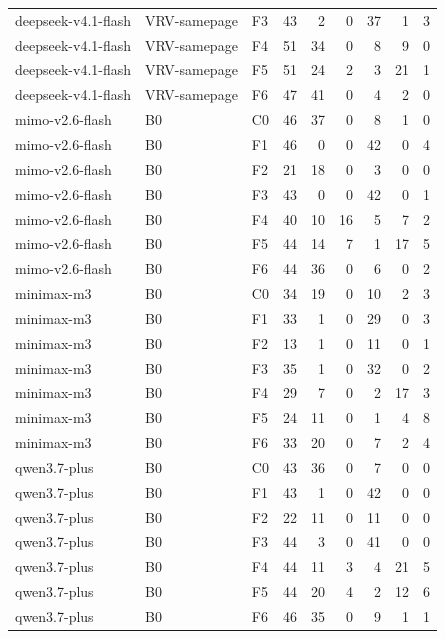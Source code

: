 \begin{tabular}{lllrrrrrr}
deepseek-v4.1-flash & VRV-samepage & F3 & 43 & 2 & 0 & 37 & 1 & 3 \\
deepseek-v4.1-flash & VRV-samepage & F4 & 51 & 34 & 0 & 8 & 9 & 0 \\
deepseek-v4.1-flash & VRV-samepage & F5 & 51 & 24 & 2 & 3 & 21 & 1 \\
deepseek-v4.1-flash & VRV-samepage & F6 & 47 & 41 & 0 & 4 & 2 & 0 \\
mimo-v2.6-flash & B0 & C0 & 46 & 37 & 0 & 8 & 1 & 0 \\
mimo-v2.6-flash & B0 & F1 & 46 & 0 & 0 & 42 & 0 & 4 \\
mimo-v2.6-flash & B0 & F2 & 21 & 18 & 0 & 3 & 0 & 0 \\
mimo-v2.6-flash & B0 & F3 & 43 & 0 & 0 & 42 & 0 & 1 \\
mimo-v2.6-flash & B0 & F4 & 40 & 10 & 16 & 5 & 7 & 2 \\
mimo-v2.6-flash & B0 & F5 & 44 & 14 & 7 & 1 & 17 & 5 \\
mimo-v2.6-flash & B0 & F6 & 44 & 36 & 0 & 6 & 0 & 2 \\
minimax-m3 & B0 & C0 & 34 & 19 & 0 & 10 & 2 & 3 \\
minimax-m3 & B0 & F1 & 33 & 1 & 0 & 29 & 0 & 3 \\
minimax-m3 & B0 & F2 & 13 & 1 & 0 & 11 & 0 & 1 \\
minimax-m3 & B0 & F3 & 35 & 1 & 0 & 32 & 0 & 2 \\
minimax-m3 & B0 & F4 & 29 & 7 & 0 & 2 & 17 & 3 \\
minimax-m3 & B0 & F5 & 24 & 11 & 0 & 1 & 4 & 8 \\
minimax-m3 & B0 & F6 & 33 & 20 & 0 & 7 & 2 & 4 \\
qwen3.7-plus & B0 & C0 & 43 & 36 & 0 & 7 & 0 & 0 \\
qwen3.7-plus & B0 & F1 & 43 & 1 & 0 & 42 & 0 & 0 \\
qwen3.7-plus & B0 & F2 & 22 & 11 & 0 & 11 & 0 & 0 \\
qwen3.7-plus & B0 & F3 & 44 & 3 & 0 & 41 & 0 & 0 \\
qwen3.7-plus & B0 & F4 & 44 & 11 & 3 & 4 & 21 & 5 \\
qwen3.7-plus & B0 & F5 & 44 & 20 & 4 & 2 & 12 & 6 \\
qwen3.7-plus & B0 & F6 & 46 & 35 & 0 & 9 & 1 & 1 \\
\bottomrule
\end{tabular}
